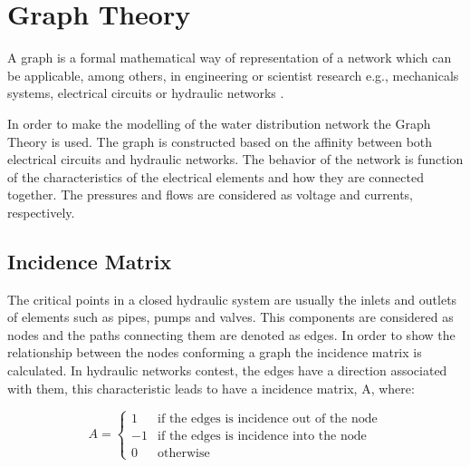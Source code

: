 \section{Graph Theory}  
\label{GraphTheory}
A graph is a formal mathematical way of representation of a network which can be applicable, among others, 
in engineering or scientist research e.g., mechanicals systems, electrical circuits or hydraulic networks \cite{graph_intro}. 

In order to make the modelling of the water distribution network the Graph Theory is used. The graph is constructed 
based on the affinity between both electrical circuits and hydraulic networks. 
The behavior of the network is function of the characteristics of the 
electrical elements and how they are connected together. The pressures and flows are considered as 
voltage and currents, respectively.

\subsection{Incidence Matrix} 

The critical points in a closed hydraulic system are usually the inlets and outlets of elements such as pipes, pumps and valves. 
This components are considered as nodes and the paths connecting them are denoted as edges. 
In order to show the relationship between the nodes conforming a graph the 
incidence matrix is calculated. In hydraulic networks contest, the edges have a 
direction associated with them, this characteristic leads to have a incidence matrix, A, where:

\begin{equation}
\label{DiGraph}
 A =
		\left\{
		\begin{array}{ll}
		
		1 			&      \text{if the edges is incidence out of the node}	
\\
		-1                       &     \text{if the edges is incidence into the node}
\\

                0                       &      \text{otherwise}

		\end{array}
		\right.
\end{equation}	


 
%
%

 
 
 